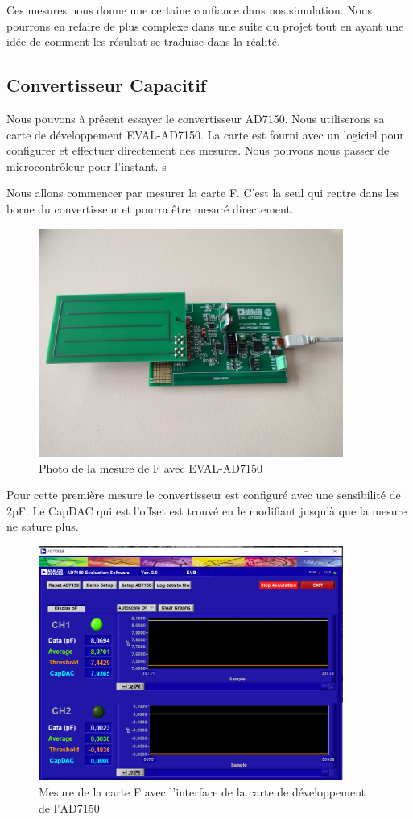 Ces mesures nous donne une certaine confiance dans nos simulation. Nous pourrons en refaire de plus complexe dans une suite du projet tout en ayant une idée de comment les résultat se traduise dans la réalité.  


\subsection{Convertisseur Capacitif}

Nous pouvons à présent essayer le convertisseur AD7150. Nous utiliserons sa carte de développement EVAL-AD7150. La carte est fourni avec un logiciel pour configurer et effectuer directement des mesures. Nous pouvons nous passer de microcontrôleur pour l'instant. s

Nous allons commencer par mesurer la carte F. C'est la seul qui rentre dans les borne du convertisseur et pourra être mesuré directement. 

\begin{figure}[!ht]
\centering
 \includegraphics[width=10cm]{ADPhoto.jpg}
 \caption{Photo de la mesure de F avec EVAL-AD7150}
\end{figure}

\newpage

Pour cette première mesure le convertisseur est configuré avec une sensibilité de 2pF. Le CapDAC qui est l'offset est trouvé en le modifiant jusqu'à que la mesure ne sature plus. 

\begin{figure}[!ht]
\centering
 \includegraphics[width=10cm]{Fadair.png}
 \caption{Mesure de la carte F avec l'interface de la carte de développement de l'AD7150  }
\end{figure}

